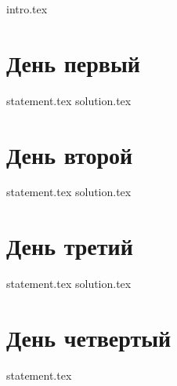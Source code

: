 {intro.tex}

\section{День первый}
{statement.tex}
{solution.tex}

\section{День второй}
{statement.tex}
{solution.tex}

\section{День третий}
{statement.tex}
{solution.tex}

\section{День четвертый}
{statement.tex}